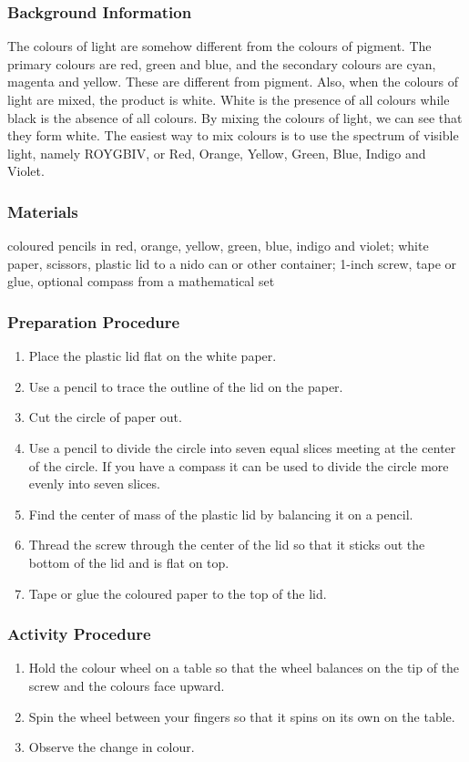 \subsubsection*{Background Information}
The colours of light are somehow different from the colours of pigment. The primary colours are red, green and blue, and the secondary colours are cyan, magenta and yellow. These are different from pigment. Also, when the colours of light are mixed, the product is white. White is the presence of all colours while black is the absence of all colours.  
By mixing the colours of light, we can see that they form white. The easiest way to mix colours is to use the spectrum of visible light, namely ROYGBIV, or Red, Orange, Yellow, Green, Blue, Indigo and Violet.  

\subsubsection*{Materials}
coloured pencils in red, orange, yellow, green, blue, indigo and violet; white paper, scissors, plastic lid to a nido can or other container; 1-inch screw, tape or glue, optional compass from a mathematical set

\subsubsection*{Preparation Procedure}
\begin{enumerate}
\item{Place the plastic lid flat on the white paper.} 
\item{Use a pencil to trace the outline of the lid on the paper.} 
\item{Cut the circle of paper out.} 
\item{Use a pencil to divide the circle into seven equal slices meeting at the center of the circle.  If you have a compass it can be used to divide the circle more evenly into seven slices.} 
\item{Find the center of mass of the plastic lid by balancing it on a pencil.} 
\item{Thread the screw through the center of the lid so that it sticks out the bottom of the lid and is flat on top.} 
\item{Tape or glue the coloured paper to the top of the lid.} 
\end{enumerate}

\subsubsection*{Activity Procedure}
\begin{enumerate}
\item{Hold the colour wheel on a table so that the wheel balances on the tip of the screw and the colours face upward.} 
\item{Spin the wheel between your fingers so that it spins on its own on the table.} 
\item{Observe the change in colour.} 
\end{enumerate}

